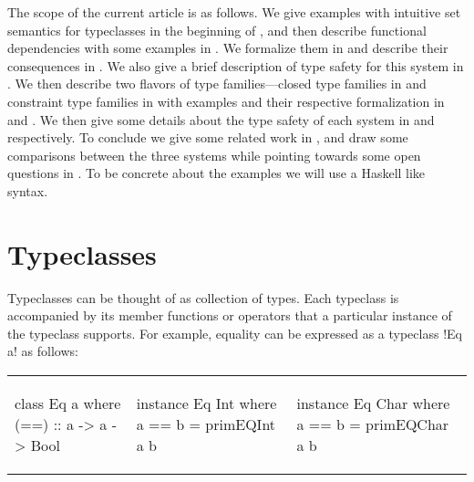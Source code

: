 \documentclass[format=sigplan,manuscript,review,screen,nonacm,margin=1in]{acmart}
\begin{document}
The scope of the current article is as follows.
We give examples with intuitive set semantics for typeclasses in the beginning of ,
and then describe functional dependencies\cite{jones_tcfd_2000} with some examples in .
We formalize them in  and describe their consequences %
in .
We also give a brief description of type safety for this system in .
We then describe two flavors of type families---closed type families\cite{eisenberg_typefamilies_2014}
in  and  constraint type families\cite{morris_typefamilies_2017}
in  with examples and their respective formalization in 
and . We then give some details about the type safety of
each system in  and  respectively.
To conclude we give some related work in , and draw some comparisons
between the three systems while pointing towards some open questions in .
To be concrete about the examples we will use a Haskell like syntax.

\section{Typeclasses}\label{sec:tc}
Typeclasses can be thought of as collection of types. Each typeclass is accompanied by its member
functions or operators that a particular instance of the typeclass supports. For example,
equality can be expressed as a typeclass !Eq a! as follows:\newline
\begin{tabular}{l l l}
\begin{code}
class Eq a where
  (==) :: a -> a -> Bool
\end{code}&%
\begin{code}
instance Eq Int where
  a == b = primEQInt a b
\end{code}&%
\begin{code}
instance Eq Char where
  a == b = primEQChar a b
\end{code}%
\end{tabular}
\end{document}
